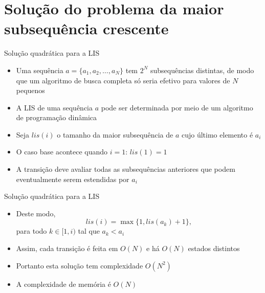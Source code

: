 \section{Solução do problema da maior subsequência crescente}

\begin{frame}[fragile]{Solução quadrática para a LIS}

    \begin{itemize}
        \item Uma sequência $a = \{ a_1, a_2, \ldots, a_N \}$ tem $2^N$ subsequências
            distintas, de modo que um algoritmo de busca completa só seria efetivo para
            valores de $N$ pequenos

        \item A LIS de uma sequência $a$ pode ser determinada por meio de um algoritmo de
            programação dinâmica

        \item Seja $lis(i)$ o tamanho da maior subsequência de $a$ cujo último elemento é
            $a_i$

        \item O caso base acontece quando $i = 1$: $lis(1) = 1$

        \item A transição deve avaliar todas as subsequências anteriores que podem 
            eventualmente serem estendidas por $a_i$
    \end{itemize}

\end{frame}

\begin{frame}[fragile]{Solução quadrática para a LIS}

    \begin{itemize}
        \item Deste modo,
        \[
            lis(i) = \max \{ 1, lis(a_k) + 1 \},
        \]
        para todo $k\in [1, i)$ tal que $a_k < a_i$

        \item Assim, cada transição é feita em $O(N)$ e há $O(N)$ estados distintos

        \item Portanto esta solução tem complexidade $O(N^2)$

        \item A complexidade de memória é $O(N)$
    \end{itemize}

\end{frame}

